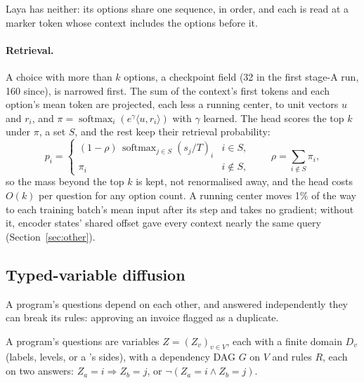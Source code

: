 Laya has neither: its options share one sequence, in order, and each is read at
a marker token whose context includes the options before it.

\paragraph{Retrieval.}
A choice with more than $k$ options, a checkpoint field (32 in the first stage-A
run, 160 since), is narrowed first. The sum of the context's first tokens and
each option's mean token are projected, each less a running center, to unit
vectors $u$ and $r_i$, and
$\pi = \operatorname{softmax}_i(e^{\gamma}\langle u, r_i\rangle)$ with $\gamma$
learned. The head scores the top $k$ under $\pi$, a set $S$, and the rest keep
their retrieval probability:
\begin{equation}
  p_i = \begin{cases} (1-\rho)\,\operatorname{softmax}_{j \in S}(s_j/T)_i & i \in S,\\
  \pi_i & i \notin S,\end{cases}
  \qquad \rho = \sum_{i \notin S} \pi_i ,
\end{equation}
so the mass beyond the top $k$ is kept, not renormalised away, and the head
costs $O(k)$ per question for any option count. A running center moves 1\% of
the way to each training batch's mean input after its step and takes no
gradient; without it, encoder states' shared offset gave every context nearly
the same query (Section~\ref{sec:other}).

\subsection{Typed-variable diffusion}
\label{sec:diffusion}

A program's questions depend on each other, and answered independently they
can break its rules: approving an invoice flagged as a duplicate.

\begin{definition}
A program's questions are variables $Z = (Z_v)_{v \in V}$, each with a finite
domain $D_v$ (labels, levels, or a 's sides), with a dependency DAG
$G$ on $V$ and rules $R$, each on two answers:
$Z_a = i \Rightarrow Z_b = j$, or $\lnot(Z_a = i \land Z_b = j)$.
\end{definition}

